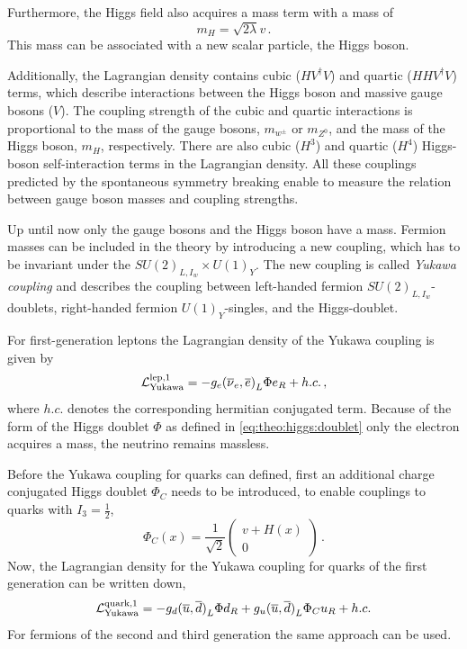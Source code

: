 Furthermore, the Higgs field also acquires a mass term with a mass of
\begin{equation}
    m_H = \sqrt{2\lambda} v \,.
\end{equation}
This mass can be associated with a new scalar particle, the Higgs boson.

Additionally, the Lagrangian density contains cubic ($HV^\dagger V$) and quartic ($HHV^\dagger V$) terms, which describe
interactions between the Higgs boson and massive gauge bosons ($V$).
The coupling strength of the cubic and quartic interactions is proportional
to the mass of the gauge bosons, $m_{w^\pm}$ or $m_{Z^0}$, and the mass of the Higgs boson, $m_H$, respectively.
There are also cubic ($H^3$) and quartic ($H^4$) Higgs-boson self-interaction terms in the Lagrangian density.
All these couplings predicted by the spontaneous symmetry breaking enable to measure the relation between gauge boson
masses and coupling strengths.

Up until now only the gauge bosons and the Higgs boson have a mass.
Fermion masses can be included in the theory by introducing a new coupling, which has to be invariant under the $SU{(2)}_{L,I_w} \times U{(1)}_Y$.
The new coupling is called \emph{Yukawa coupling} and describes the coupling between left-handed fermion $SU{(2)}_{L,I_w}$-doublets,
right-handed fermion $U{(1)}_Y$-singles, and the Higgs-doublet.

For first-generation leptons the Lagrangian density of the Yukawa coupling is given by
\begin{equation}
    \mathcal{L}_\text{Yukawa}^\text{lep,1} = - g_e {(\overline{\nu}_e, \overline{e})}_L \Phi e_R + h.c. \,,
\end{equation}
where $h.c.$ denotes the corresponding hermitian conjugated term.
Because of the form of the Higgs doublet $\Phi$ as defined in \cref{eq:theo:higgs:doublet} only the electron
acquires a mass, the neutrino remains massless.

Before the Yukawa coupling for quarks can defined, first an additional charge conjugated Higgs doublet $\Phi_C$
needs to be introduced, to enable couplings to quarks with $I_3 = \frac{1}{2}$,
\begin{equation}
    \Phi_C(x) = \frac{1}{\sqrt{2}}
    \begin{pmatrix}
        v + H(x) \\ 0
    \end{pmatrix} \,.
\end{equation}
Now, the Lagrangian density for the Yukawa coupling for quarks of the first generation can be written down,
\begin{equation}
    \mathcal{L}_\text{Yukawa}^\text{quark,1} = -g_d {(\overline{u}, \overline{d})}_L \Phi d_R + g_u {(\overline{u}, \overline{d})}_L \Phi_C u_R + h.c.
\end{equation}
For fermions of the second and third generation the same approach can be used.


